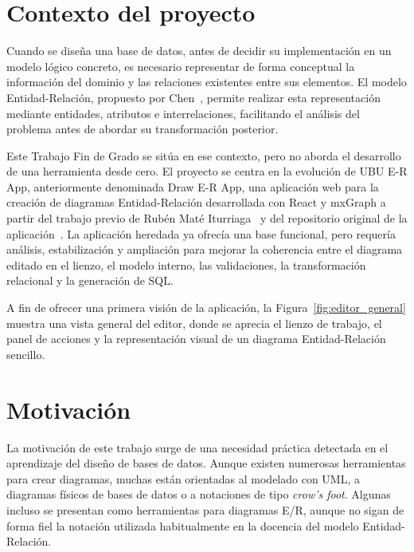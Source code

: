 
\section{Contexto del proyecto}

Cuando se diseña una base de datos, antes de decidir su implementación en un modelo lógico concreto, es necesario representar de forma conceptual la información del dominio y las relaciones existentes entre sus elementos. El modelo Entidad-Relación, propuesto por Chen~\cite{chen1976}, permite realizar esta representación mediante entidades, atributos e interrelaciones, facilitando el análisis del problema antes de abordar su transformación posterior.

Este Trabajo Fin de Grado se sitúa en ese contexto, pero no aborda el desarrollo de una herramienta desde cero. El proyecto se centra en la evolución de UBU E-R App, anteriormente denominada Draw E-R App, una aplicación web para la creación de diagramas Entidad-Relación desarrollada con React y mxGraph a partir del trabajo previo de Rubén Maté Iturriaga~\cite{mate2024drawERApp} y del repositorio original de la aplicación~\cite{mate2024drawERRepo}. La aplicación heredada ya ofrecía una base funcional, pero requería análisis, estabilización y ampliación para mejorar la coherencia entre el diagrama editado en el lienzo, el modelo interno, las validaciones, la transformación relacional y la generación de SQL.

A fin de ofrecer una primera visión de la aplicación, la Figura~\ref{fig:editor_general} muestra una vista general del editor, donde se aprecia el lienzo de trabajo, el panel de acciones y la representación visual de un diagrama Entidad-Relación sencillo.


\section{Motivación}

La motivación de este trabajo surge de una necesidad práctica detectada en el aprendizaje del diseño de bases de datos. Aunque existen numerosas herramientas para crear diagramas, muchas están orientadas al modelado con UML, a diagramas físicos de bases de datos o a notaciones de tipo \textit{crow's foot}. Algunas incluso se presentan como herramientas para diagramas E/R, aunque no sigan de forma fiel la notación utilizada habitualmente en la docencia del modelo Entidad-Relación.

